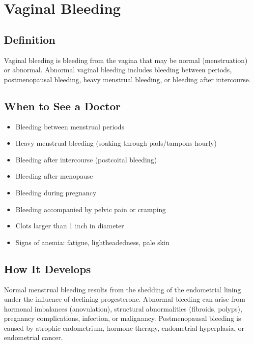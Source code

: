 \chapter{Vaginal Bleeding}

\section*{Definition}
Vaginal bleeding is bleeding from the vagina that may be normal (menstruation) or abnormal. Abnormal vaginal bleeding includes bleeding between periods, postmenopausal bleeding, heavy menstrual bleeding, or bleeding after intercourse.

\section*{When to See a Doctor}
\begin{itemize}
\item Bleeding between menstrual periods
\item Heavy menstrual bleeding (soaking through pads/tampons hourly)
\item Bleeding after intercourse (postcoital bleeding)
\item Bleeding after menopause
\item Bleeding during pregnancy
\item Bleeding accompanied by pelvic pain or cramping
\item Clots larger than 1 inch in diameter
\item Signs of anemia: fatigue, lightheadedness, pale skin
\end{itemize}

\section*{How It Develops}
Normal menstrual bleeding results from the shedding of the endometrial lining under the influence of declining progesterone. Abnormal bleeding can arise from hormonal imbalances (anovulation), structural abnormalities (fibroids, polyps), pregnancy complications, infection, or malignancy. Postmenopausal bleeding is caused by atrophic endometrium, hormone therapy, endometrial hyperplasia, or endometrial cancer.

